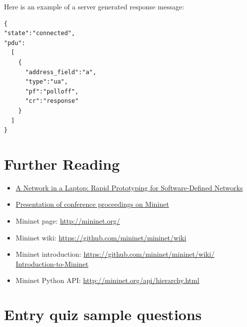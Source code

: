 \documentclass[a4paper]{article}
\begin{document}
Here is an example of a server generated response message:
\begin{verbatim}
{
"state":"connected",
"pdu":
  [
    {
      "address_field":"a",
      "type":"ua",
      "pf":"polloff",
      "cr":"response"
    }
  ]
}
\end{verbatim}

\section{Further Reading}

\begin{itemize}
    \item \href{https://qosip.tmit.bme.hu/foswiki/pub/Meres/OpenFlowMScMeresiSegedlet/a19-lantz.pdf}{A Network in a
              Laptop: Rapid Prototyping for Software-Defined Networks}
    \item

          \href{https://qosip.tmit.bme.hu/foswiki/pub/Meres/OpenFlowMScMeresiSegedlet/mininet-hotnets2010-final.pdf}{Presentation
              of conference proceedings on Mininet}
    \item	Mininet page: \url{http://mininet.org/}
    \item	Mininet wiki: \url{https://github.com/mininet/mininet/wiki}
    \item	Mininet introduction: \url{https://github.com/mininet/mininet/wiki/  Introduction-to-Mininet}
    \item	Mininet Python API: \url{http://mininet.org/api/hierarchy.html}
\end{itemize}

\appendix

\section{Entry quiz sample questions}

\end{document}
